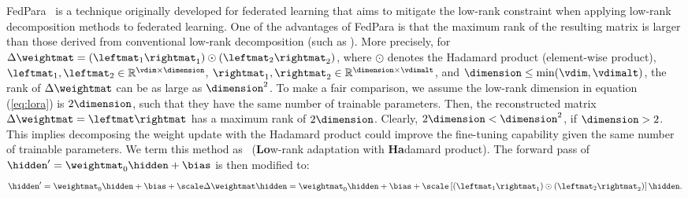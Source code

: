 FedPara~\citep{hyeon-woo2022fedpara} is a technique originally developed for federated learning that aims to mitigate the low-rank constraint when applying low-rank decomposition methods to federated learning. One of the advantages of FedPara is that the maximum rank of the resulting matrix is larger than those derived from conventional low-rank decomposition (such as \lora). More precisely,  for $\Delta \weightmat = (\leftmat_1 \rightmat_1) \odot (\leftmat_2 \rightmat_2)$, where $\odot$ denotes the Hadamard product (element-wise product), $\leftmat_{1},\leftmat_{2}  \in \mathbb{R}^{\vdim \times \dimension}$, $\rightmat_{1},\rightmat_{2} \in \mathbb{R}^{\dimension \times \vdimalt}$, and $\dimension \leq \min(\vdim, \vdimalt)$, the rank of $\Delta \weightmat$ can be as large as $\dimension^2$. To make a fair comparison, we assume the low-rank dimension in equation (\ref{eq:lora}) is $2\dimension$, such that they have the same number of trainable parameters. Then, the reconstructed matrix $\Delta \weightmat = \leftmat\rightmat$ has a maximum rank of $2\dimension$. Clearly, $ 2\dimension < \dimension^2 $, if $\dimension > 2$. This implies decomposing the weight update with the Hadamard product could improve the fine-tuning capability given the same number of trainable parameters. We term this method as \loha~(\textbf{Lo}w-rank adaptation with \textbf{Ha}damard product). The forward pass of $\hidden^{\prime} = \weightmat_{0}\hidden +\bias$ is then modified to:\vspace{2pt}
\begin{equation}\label{equ:loha}
\hidden^{\prime} = \weightmat_{0}\hidden +\bias  + \scale \Delta \weightmat \hidden =  \weightmat_{0}\hidden +\bias + \scale\left[(\leftmat_1 \rightmat_1) \odot (\leftmat_2 \rightmat_2)\right] \hidden.
\end{equation}
%
 


